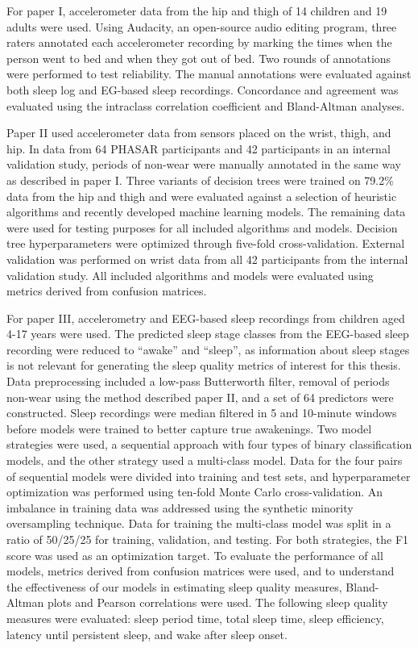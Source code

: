\documentclass[
  10pt,
]{scrbook}
\begin{document}
For paper I, accelerometer data from the hip and thigh of 14 children
and 19 adults were used. Using Audacity, an open-source audio editing
program, three raters annotated each accelerometer recording by marking
the times when the person went to bed and when they got out of bed. Two
rounds of annotations were performed to test reliability. The manual
annotations were evaluated against both sleep log and EG-based sleep
recordings. Concordance and agreement was evaluated using the intraclass
correlation coefficient and Bland-Altman analyses.

Paper II used accelerometer data from sensors placed on the wrist,
thigh, and hip. In data from 64 PHASAR participants and 42 participants
in an internal validation study, periods of non-wear were manually
annotated in the same way as described in paper I. Three variants of
decision trees were trained on 79.2\% data from the hip and thigh and
were evaluated against a selection of heuristic algorithms and recently
developed machine learning models. The remaining data were used for
testing purposes for all included algorithms and models. Decision tree
hyperparameters were optimized through five-fold cross-validation.
External validation was performed on wrist data from all 42 participants
from the internal validation study. All included algorithms and models
were evaluated using metrics derived from confusion matrices.

For paper III, accelerometry and EEG-based sleep recordings from
children aged 4-17 years were used. The predicted sleep stage classes
from the EEG-based sleep recording were reduced to ``awake'' and
``sleep'', as information about sleep stages is not relevant for
generating the sleep quality metrics of interest for this thesis. Data
preprocessing included a low-pass Butterworth filter, removal of periods
non-wear using the method described paper II, and a set of 64 predictors
were constructed. Sleep recordings were median filtered in 5 and
10-minute windows before models were trained to better capture true
awakenings. Two model strategies were used, a sequential approach with
four types of binary classification models, and the other strategy used
a multi-class model. Data for the four pairs of sequential models were
divided into training and test sets, and hyperparameter optimization was
performed using ten-fold Monte Carlo cross-validation. An imbalance in
training data was addressed using the synthetic minority oversampling
technique. Data for training the multi-class model was split in a ratio
of 50/25/25 for training, validation, and testing. For both strategies,
the F1 score was used as an optimization target. To evaluate the
performance of all models, metrics derived from confusion matrices were
used, and to understand the effectiveness of our models in estimating
sleep quality measures, Bland-Altman plots and Pearson correlations were
used. The following sleep quality measures were evaluated: sleep period
time, total sleep time, sleep efficiency, latency until persistent
sleep, and wake after sleep onset.
\end{document}
